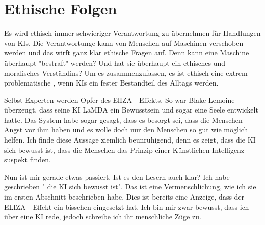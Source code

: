 \documentclass{report}
\begin{document}
\section{Ethische Folgen}
Es wird ethisch immer schwieriger Verantwortung zu übernehmen für Handlungen von KIs. Die Verantwortunge kann von Menschen auf Maschinen verschoben werden und das wirft ganz klar ethische Fragen auf. Denn kann eine Maschine überhaupt "bestraft" werden? Und hat sie überhaupt ein ethisches und moralisches Verständins? Um es zusammenzufassen, es ist ethisch eine extrem problematische , wenn KIs ein fester Bestandteil des Alltags werden.
\par
Selbst Experten werden Opfer des ElIZA - Effekts. So war Blake Lemoine überzeugt, dass seine KI LaMDA ein Bewusstsein und sogar eine Seele entwickelt hatte. Das System habe sogar gesagt, dass es besorgt sei, dass die Menschen Angst vor ihm haben und es wolle doch nur den Menschen so gut wie möglich helfen. Ich finde diese Aussage ziemlich beunruhigend, denn es zeigt, dass die KI sich bewusst ist, dass die Menschen das Prinzip einer Künstlichen Intelligenz suspekt finden. 
\par
Nun ist mir gerade etwas passiert. Ist es den Lesern auch klar? Ich habe geschrieben " die KI sich bewusst ist". Das ist eine Vermenschlichung, wie ich sie im ersten Abschnitt beschrieben habe. Dies ist bereits eine Anzeige, dass der ELIZA - Effekt ein bisschen eingesetzt hat. Ich bin mir zwar bewusst, dass ich über eine KI rede, jedoch schreibe ich ihr menschliche Züge zu. 


\printbibliography
\end{document}
